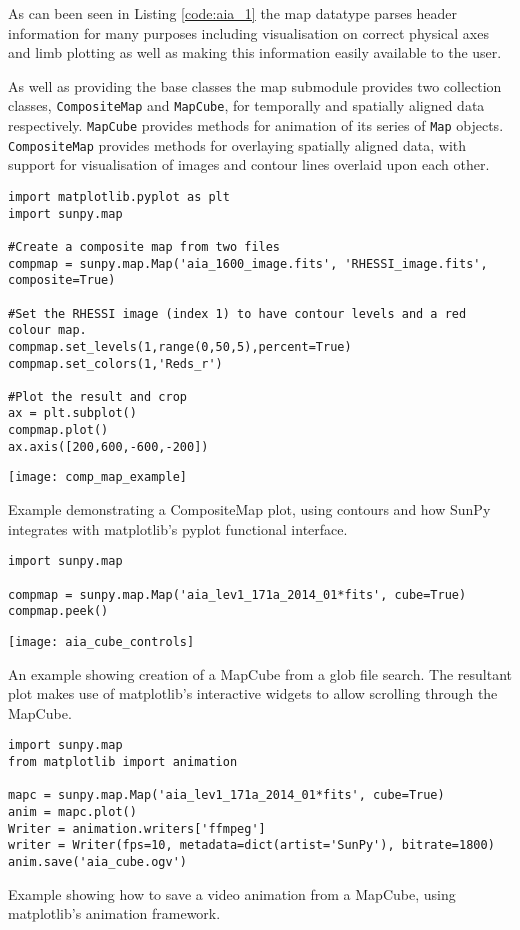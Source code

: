 As can been seen in Listing \ref{code:aia_1} the map datatype parses header 
information for many purposes including visualisation on correct physical axes 
and limb plotting as well as making this information easily available to the 
user.

As well as providing the base classes the map submodule provides two 
collection classes, \texttt{CompositeMap} and \texttt{MapCube}, for 
temporally and spatially aligned data respectively. \texttt{MapCube} 
provides methods for animation of its series of \texttt{Map} objects. 
\texttt{CompositeMap} provides methods for overlaying spatially aligned 
data, with support for visualisation of images and contour lines overlaid 
upon each other.

\begin{listing}[h]
\begin{verbatim}
import matplotlib.pyplot as plt
import sunpy.map

#Create a composite map from two files
compmap = sunpy.map.Map('aia_1600_image.fits', 'RHESSI_image.fits', 
composite=True)

#Set the RHESSI image (index 1) to have contour levels and a red colour map.
compmap.set_levels(1,range(0,50,5),percent=True)
compmap.set_colors(1,'Reds_r')

#Plot the result and crop
ax = plt.subplot()
compmap.plot()
ax.axis([200,600,-600,-200])
\end{verbatim}
\texttt{[image: comp\_map\_example]}
\caption{Example demonstrating a CompositeMap plot, using contours and how 
SunPy integrates with matplotlib's pyplot functional interface.}
\label{code:compmap_1}
\end{listing}

\begin{listing}[h]
\begin{verbatim}
import sunpy.map

compmap = sunpy.map.Map('aia_lev1_171a_2014_01*fits', cube=True)
compmap.peek()
\end{verbatim}
\texttt{[image: aia\_cube\_controls]}
\caption{An example showing creation of a MapCube from a glob file search. The 
resultant plot makes use of matplotlib's interactive widgets to allow scrolling 
through the MapCube.}
\label{code:mapcube_1}
\end{listing}

\begin{listing}[h]
\begin{verbatim}
import sunpy.map
from matplotlib import animation

mapc = sunpy.map.Map('aia_lev1_171a_2014_01*fits', cube=True)
anim = mapc.plot()
Writer = animation.writers['ffmpeg']
writer = Writer(fps=10, metadata=dict(artist='SunPy'), bitrate=1800)
anim.save('aia_cube.ogv')
\end{verbatim}
\caption{Example showing how to save a video animation from a MapCube, using 
matplotlib's animation framework.}
\label{code:mapcube_2}
\end{listing}